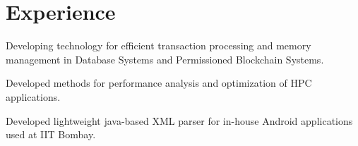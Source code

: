 \documentclass[]{deedy-resume-openfont}
\begin{document}
\begin{minipage}[t]{0.66\textwidth}

\section{Experience}

Developing technology for efficient transaction processing and memory management in Database Systems and Permissioned Blockchain Systems.
\sectionsep

Developed methods for performance analysis and optimization of HPC applications.
\sectionsep

Developed lightweight java-based XML parser for in-house Android applications used at IIT Bombay.

\end{minipage} 
\end{document}

